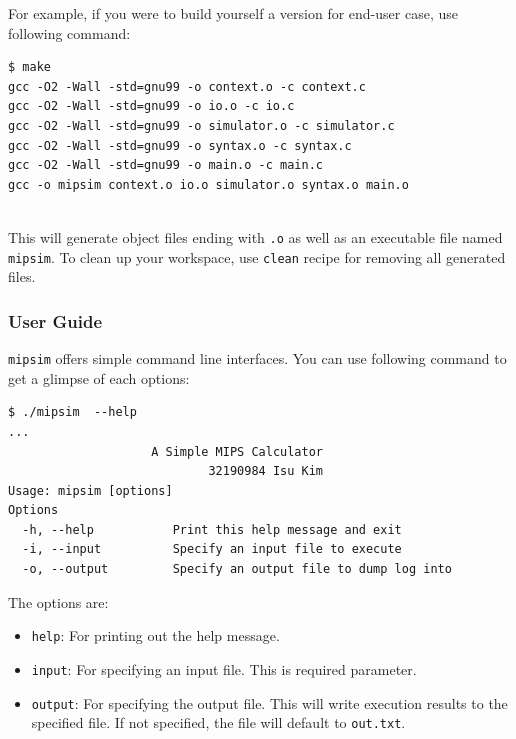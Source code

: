 \documentclass{homework}
\begin{document}
For example, if you were to build yourself a version for end-user case, use following command:
\\
\begin{center}
\begin{code}
\begin{verbatim}
$ make
gcc -O2 -Wall -std=gnu99 -o context.o -c context.c
gcc -O2 -Wall -std=gnu99 -o io.o -c io.c
gcc -O2 -Wall -std=gnu99 -o simulator.o -c simulator.c
gcc -O2 -Wall -std=gnu99 -o syntax.o -c syntax.c
gcc -O2 -Wall -std=gnu99 -o main.o -c main.c
gcc -o mipsim context.o io.o simulator.o syntax.o main.o
\end{verbatim}
\end{code}
\end{center}
\\
This will generate object files ending with \texttt{.o} as well as an executable file named \texttt{mipsim}. To clean up your workspace, use \texttt{clean} recipe for removing all generated files.

\subsubsection{User Guide}
\texttt{mipsim} offers simple command line interfaces. You can use following command to get a glimpse of each options:
\\
\begin{center}
\begin{code}
\begin{verbatim}
$ ./mipsim  --help
...
                    A Simple MIPS Calculator
                            32190984 Isu Kim
Usage: mipsim [options]
Options
  -h, --help           Print this help message and exit
  -i, --input          Specify an input file to execute
  -o, --output         Specify an output file to dump log into
\end{verbatim}
\end{code}
\end{center}

The options are:
\begin{itemize}
    \item \texttt{help}: For printing out the help message.
    \item \texttt{input}: For specifying an input file. This is required parameter.
    \item \texttt{output}: For specifying the output file. This will write execution results to the specified file. If not specified, the file will default to \texttt{out.txt}.
\end{itemize}
\end{document}
